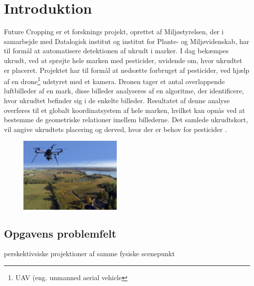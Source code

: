 \chapter{Introduktion} \label{sec:intro}
Future Cropping er et forsknings projekt, oprettet af Miljøstyrelsen, der i samarbejde med Datalogisk institut og institut for Plante- og Miljøvidenskab, har til formål at automatisere detektionen af ukrudt i marker. I dag bekæmpes ukrudt, ved at sprøjte hele marken med pesticider, uvidende om, hvor ukrudtet er placeret. Projektet har til formål at nedsætte forbruget af pesticider, ved hjælp af en drone\footnote{UAV (eng. unmanned aerial vehicle} udstyret med et kamera. Dronen tager et antal overlappende luftbilleder af en mark, disse billeder analyseres af en algoritme, der identificere, hvor ukrudtet befinder sig i de enkelte billeder. Resultatet af denne analyse overføres til et globalt koordinatsystem af hele marken, hvilket kan opnås ved at bestemme de geometriske relationer imellem billederne. Det samlede ukrudtskort, vil angive ukrudtets placering og derved, hvor der er behov for pesticider \cite{drone}.
\begin{figure}[H]
    \centering
    \includegraphics[width=0.45\textwidth]{fig/drone4.jpg}
     \vspace{-0.5em}
    \begin{center}    
       \caption{\textcolor{gray}{\footnotesize \textit{ }}}
    \label{fig:difference}
     \end{center}
     \vspace{-3em}
  \end{figure} \noindent
\section{Opgavens problemfelt} \label{subsec:felt}

perskektivsiske projektioner af samme fysiske scenepunkt




